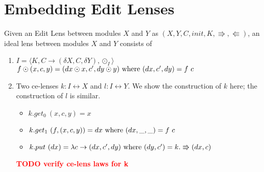 \documentclass[a4paper,10pt]{article}
\newcommand{\finish}[1]{#1}
\newcommand{\comment}[1]{\finish{\textbf{\textcolor{red}{#1}}}}
\begin{document}
\section{Embedding Edit Lenses}
Given an Edit Lens between modules $X$ and $Y$ as $(X,Y,C,init,K,\Rrightarrow,\Lleftarrow)$, an ideal lens between modules $X$ and $Y$ consists of
\begin{enumerate}

\item $I = \langle K, C \to (\delta X, C, \delta Y), \odot_I \rangle$ \\
      $f \odot (x, c, y) = (dx \odot x, c', dy \odot y) \textnormal{ where } (dx, c', dy) = f~c $ 
\item Two ce-lenses $k: I \leftrightarrow X$ and $l : I \leftrightarrow Y$. We show the construction of $k$ here; the construction of $l$ is similar.
  \begin{itemize}
   \item $k.get_0~(x,c,y) = x$
   \item $k.get_1~(f, (x,c,y)) = dx \textnormal{ where } (dx, \_, \_) = f~c$
   \item $k.put~(dx) = \lambda c \to (dx, c', dy) \textnormal{ where } (dy, c') = k.\Rrightarrow(dx, c)$
  \end{itemize}
  
\comment{TODO verify ce-lens laws for k}

\end{enumerate}
\end{document}
